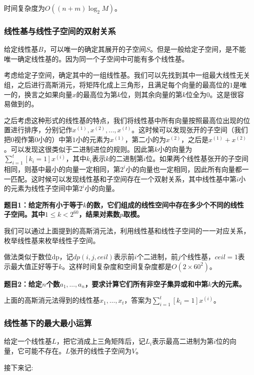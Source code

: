 \documentclass[UTF8, twoside]{ctexart}
\begin{document}
\begin{sloppypar}
时间复杂度为$O((n+m)\log_2 M)$。

\subsubsection{线性基与线性子空间的双射关系}

给定线性基$B$，可以唯一的确定其展开的子空间$S$。但是一般给定子空间，是不能唯一确定线性基的。因为同一个子空间中可能有多个线性基。

考虑给定子空间，确定其中的一组线性基。我们可以先找到其中一组最大线性无关组，之后进行高斯消元，将矩阵化成上三角形，且满足每个向量的最高位的$1$是唯一的，换言之如果向量$x$的最高位为第$k$位，则其余向量的第$k$位全为$0$。这是很容易做到的。

之后考虑这种形式的线性基的特点，我们将线性基中所有向量按照最高位出现的位置进行排序，分别记作$x^{(1)},x^{(2)},\ldots,x^{(t)}$。这时候可以发现张开的子空间（我们把$0$视作第$0$小的）中第$1$小的元素为$x^{(1)}$，第二小的为$x^{(2)}$，之后是$x^{(1)}+x^{(2)}$。可以发现这很类似于二进制进位的规则。因此第$k$小的向量为$\sum_{i=1}^t[k_i=1]x^{(i)}$，其中$k_i$表示$k$的二进制第$i$位。如果两个线性基张开的子空间相同，则基中最小的向量一定相同，第$2^i$小的向量也一定相同，因此所有向量都一一匹配。这时候可以发现线性基和子空间存在一个双射关系，其中线性基中第$i$小的元素为线性子空间中第$2^i$小的向量。

\textbf{题目1：给定所有小于等于$k$的数，它们组成的线性空间中存在多少个不同的线性子空间。其中$1\leq k< 2^{60}$，结果对素数$p$取模。}

我们可以通过上面提到的高斯消元法，利用线性基和线性子空间的一一对应关系，枚举线性基来枚举线性子空间。

做法类似于数位dp，记$dp(i,j,ceil)$表示前$i$个二进制，前$j$个线性基，$ceil=1$表示最大值正好等于$k$。这样时间复杂度和空间复杂度都是$O(2\times 60^2)$。

\textbf{题目2：给定$n$个数$a_1,\ldots,a_n$，要求计算它们所有非空子集异或和中第$k$大的元素。}

上面的高斯消元法得到的线性基$x_1,\ldots,x_t$，答案为$\sum_{i=1}^t[k_i=1]x^{(i)}$。

\subsubsection{线性基下的最大最小运算}

给定一个线性基$L$，把它消成上三角矩阵后，记$L_i$表示最高二进制为第$i$位的向量，它可能不存在。$L$张开的线性子空间为$V$。

接下来记:


\end{sloppypar}
\end{document}
